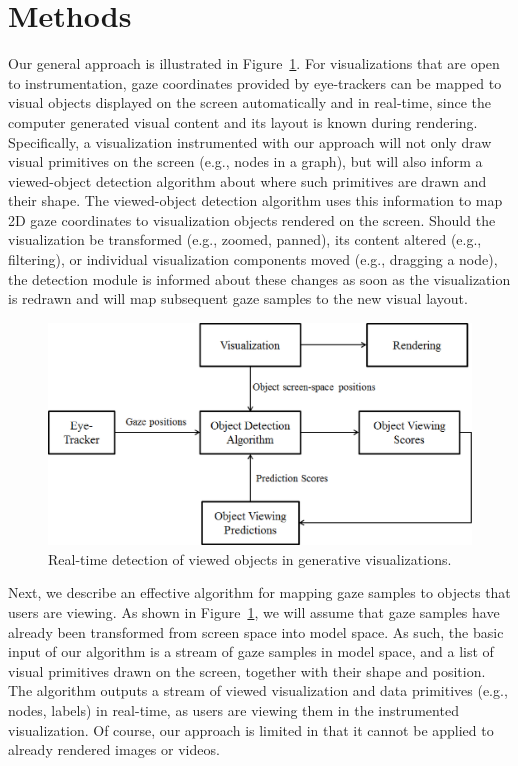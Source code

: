 ﻿\section{Methods}\label{sec:Methods}

Our general approach is illustrated in Figure~\ref{fig:systemBlockDiagram}. For visualizations that are open to instrumentation, gaze coordinates provided by eye-trackers can be mapped to visual objects displayed on the screen automatically and in real-time, since the computer generated visual content and its layout is known during rendering.  Specifically, a visualization instrumented with our approach will not only draw visual primitives on the screen (e.g., nodes in a graph), but will also inform a viewed-object detection algorithm about where such primitives are drawn and their shape. The viewed-object detection algorithm uses this information to map 2D gaze coordinates to visualization objects rendered on the screen. Should the visualization be transformed (e.g., zoomed, panned), its content altered (e.g., filtering), or individual visualization components moved (e.g., dragging a node), the detection module is informed about these changes as soon as the visualization is redrawn and will map subsequent gaze samples to the new visual layout. 

\begin{figure}[htb]
  \centering
  \includegraphics[width=0.75\linewidth]{images/systemBlockDiagram.eps}
  \caption{Real-time detection of viewed objects in generative visualizations.}
	\label{fig:systemBlockDiagram}
\end{figure}

Next, we describe an effective algorithm for mapping gaze samples to objects that users are viewing. As shown in Figure~\ref{fig:systemBlockDiagram}, we will assume that gaze samples have already been transformed from screen space into model space. As such, the basic input of our algorithm is a stream of gaze samples in model space, and a list of visual primitives drawn on the screen, together with their shape and position. The algorithm outputs a stream of viewed visualization and data primitives (e.g., nodes, labels) in real-time, as users are viewing them in the instrumented visualization. Of course, our approach is limited in that it cannot be applied to already rendered images or videos. 

